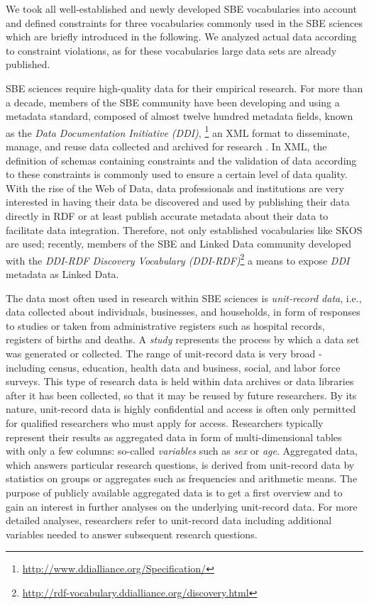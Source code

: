 \documentclass{llncs}
\begin{document}
We took all well-established and newly developed SBE vocabularies into account and defined constraints for three vocabularies commonly used in the SBE sciences which are briefly introduced in the following. We analyzed actual data according to constraint violations, as for these vocabularies large data sets are already published.

SBE sciences require high-quality data for their empirical research. For more than a decade, members of the SBE community have been developing and using a
metadata standard, composed of almost twelve hundred metadata fields, known as the \emph{Data Documentation Initiative (DDI)}, \footnote{\url{http://www.ddialliance.org/Specification/}}
an XML format to disseminate, manage,
and reuse data collected and archived for research \cite{Vardigan-2008}. 
In XML, the definition of schemas containing constraints and the validation of data according to these constraints is commonly used to ensure a certain level of data quality.
With the rise of the Web of Data, data professionals and institutions are very interested in having their data be discovered and used by publishing their data directly in RDF or at least publish accurate metadata about their data to facilitate data integration. Therefore, not only established vocabularies like SKOS are used; 
recently, members of the SBE and Linked Data community developed with the \emph{DDI-RDF Discovery Vocabulary (DDI-RDF)}\footnote{\url{http://rdf-vocabulary.ddialliance.org/discovery.html}} a means to expose \emph{DDI} metadata as Linked Data. 

The data most often used in research within SBE sciences is \emph{unit-record data}, i.e., data collected about individuals, businesses, and households, in form of responses to studies or taken from administrative registers such as hospital records, registers of births and deaths. A \emph{study} represents the process by which a data set was generated or collected. The range of unit-record data is very broad - including census, education, health data and business, social, and labor force surveys. This type of research data is held within data archives or data libraries after it has been collected, so that it may be reused by future researchers. By its nature, unit-record data is highly confidential and access is often only permitted for qualified researchers who must apply for access. Researchers typically represent their results as aggregated data in form of multi-dimensional tables with only a few columns: so-called \emph{variables} such as \emph{sex} or \emph{age}. Aggregated data, which answers particular research questions, is derived from unit-record data by statistics on groups or aggregates such as frequencies and arithmetic means. The purpose of publicly available aggregated data is to get a first overview and to gain an interest in further analyses on the underlying unit-record data. For more detailed analyses, researchers refer to unit-record data including additional variables needed to answer subsequent research questions. 
\end{document}
